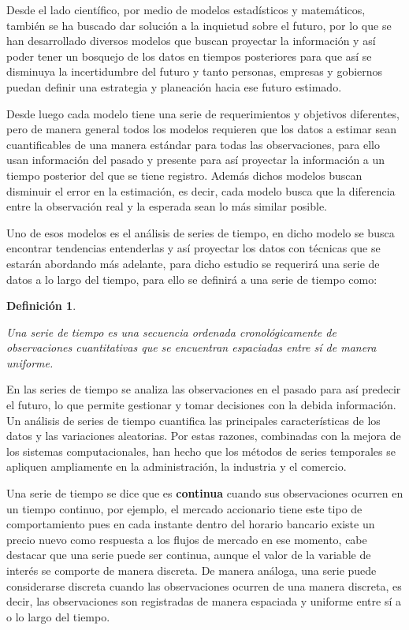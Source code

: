 \documentclass[
  spanish,
]{book}
\newtheorem{del}{Definición}[chapter]
\newenvironment{definition}
{\begin{mdframed}[backgroundcolor=grisF, rightline=false,leftline=false,topline=false, bottomline=false]\begin{del}}
		{\end{del}\end{mdframed}}
\theoremstyle{remark}
\begin{document}
Desde el lado científico, por medio de modelos estadísticos y matemáticos, también se ha buscado dar solución a la inquietud sobre el futuro, por lo que se han desarrollado diversos modelos que buscan proyectar la información y así poder tener un bosquejo de los datos en tiempos posteriores para que así se disminuya la incertidumbre del futuro y tanto personas, empresas y gobiernos puedan definir una estrategia y planeación hacia ese futuro estimado.

Desde luego cada modelo tiene una serie de requerimientos y objetivos diferentes, pero de manera general todos los modelos requieren que los datos a estimar sean cuantificables de una manera estándar para todas las observaciones, para ello usan información del pasado y presente para así proyectar la información a un tiempo posterior del que se tiene registro. Además dichos modelos buscan disminuir el error en la estimación, es decir, cada modelo busca que la diferencia entre la observación real y la esperada sean lo más similar posible.

Uno de esos modelos es el análisis de series de tiempo, en dicho modelo se busca encontrar tendencias entenderlas y así proyectar los datos con técnicas que se estarán abordando más adelante, para dicho estudio se requerirá una serie de datos a lo largo del tiempo, para ello se definirá a una serie de tiempo como:

\begin{definition}
\protect\hypertarget{def:unlabeled-div-1}{}\label{def:unlabeled-div-1}

Una serie de tiempo es una secuencia ordenada cronológicamente de observaciones cuantitativas que se encuentran espaciadas entre sí de manera uniforme.

\end{definition}

En las series de tiempo se analiza las observaciones en el pasado para así predecir el futuro, lo que permite gestionar y tomar decisiones con la debida información. Un análisis de series de tiempo cuantifica las principales características de los datos y las variaciones aleatorias. Por estas razones, combinadas con la mejora de los sistemas computacionales, han hecho que los métodos de series temporales se apliquen ampliamente en la administración, la industria y el comercio.

Una serie de tiempo se dice que es \textbf{continua} cuando sus observaciones ocurren en un tiempo continuo, por ejemplo, el mercado accionario tiene este tipo de comportamiento pues en cada instante dentro del horario bancario existe un precio nuevo como respuesta a los flujos de mercado en ese momento, cabe destacar que una serie puede ser continua, aunque el valor de la variable de interés se comporte de manera discreta. De manera análoga, una serie puede considerarse discreta cuando las observaciones ocurren de una manera discreta, es decir, las observaciones son registradas de manera espaciada y uniforme entre sí a o lo largo del tiempo.
\end{document}
